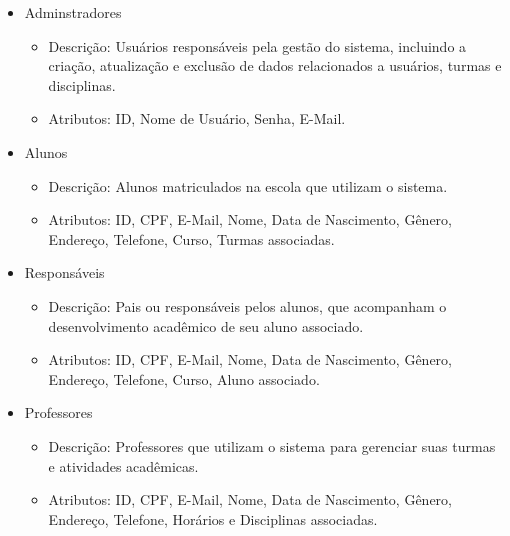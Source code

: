 \documentclass[main.tex]{subfiles}
\begin{document}
\begin{itemize}
  \item Adminstradores
  \begin{itemize}
      \item Descrição: Usuários responsáveis pela gestão do sistema, incluindo a criação, atualização e exclusão de dados relacionados a usuários, turmas e disciplinas.
      \item Atributos: ID, Nome de Usuário, Senha, E-Mail.
  \end{itemize}
  
  \item Alunos
  \begin{itemize}
      \item Descrição: Alunos matriculados na escola que utilizam o sistema.
      \item Atributos: ID, CPF, E-Mail, Nome, Data de Nascimento, Gênero, Endereço, Telefone, Curso, Turmas associadas.
  \end{itemize}
  
  \item Responsáveis
  \begin{itemize}
      \item Descrição: Pais ou responsáveis pelos alunos, que acompanham o desenvolvimento acadêmico de seu aluno associado.
      \item Atributos: ID, CPF, E-Mail, Nome, Data de Nascimento, Gênero, Endereço, Telefone, Curso, Aluno associado.
  \end{itemize}
  
  \item Professores
  \begin{itemize}
      \item Descrição: Professores que utilizam o sistema para gerenciar suas turmas e atividades acadêmicas.
      \item Atributos: ID, CPF, E-Mail, Nome, Data de Nascimento, Gênero, Endereço, Telefone, Horários e Disciplinas associadas.
  \end{itemize}
\end{itemize}


\end{document}
